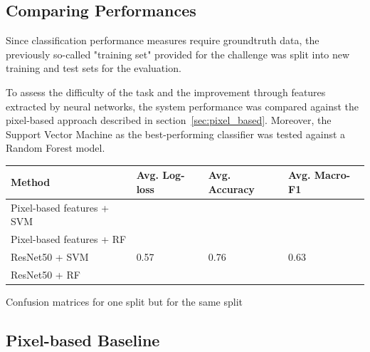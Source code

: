 \documentclass[11pt]{article}
\begin{document}
	\subsection{Comparing Performances}
	
	Since classification performance measures require groundtruth data, the previously so-called "training set" provided for the challenge was split into new training and test sets for the evaluation.
		
	To assess the difficulty of the task and the improvement through features extracted by neural networks, the system performance was compared against the pixel-based approach described in section~\ref{sec:pixel_based}.
	Moreover, the Support Vector Machine as the best-performing classifier was tested against a Random Forest model.
	
	\begin{center}
		\bgroup
		\def\arraystretch{1.1}
		\begin{tabular}{ | m{5cm} | m{2cm} | m{2cm} | m{2cm} |} 
			
			\hline
			Method & Avg. Log-loss & Avg. Accuracy & Avg. Macro-F1 \\
			\hline
			\hline
			Pixel-based features + SVM & & &  \\
			\hline
			Pixel-based features + RF & & &  \\
			\hline
			ResNet50 + SVM & 0.57 & 0.76 & 0.63 \\
			\hline
			ResNet50 + RF & & &  \\
			\hline
		\end{tabular}
		\egroup
		\label{tab:pb_vs_nn}
	\end{center}
	
	
	Confusion matrices for one split but for the same split
	\subsection{Pixel-based Baseline}
	
\end{document}
